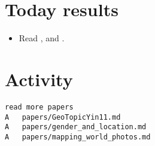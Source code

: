 \section*{Today results}
\begin{itemize}
	\item Read \cite{gender}, \cite{GeoTopicYin11} and \cite{Crandall2009}.
\end{itemize}

\section*{Activity}
\begin{verbatim}
read more papers
A	papers/GeoTopicYin11.md
A	papers/gender_and_location.md
A	papers/mapping_world_photos.md
\end{verbatim}